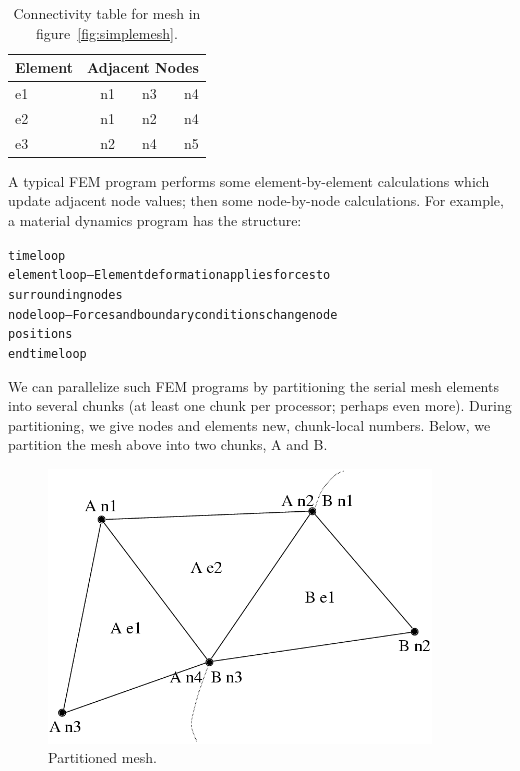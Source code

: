 \documentclass[10pt]{article}
\begin{document}
\begin{table}[h]
\begin{center}
\begin{tabular}{||l||r|r|r||}\hline
Element & \multicolumn{3}{c||}{Adjacent Nodes} \\\hline
e1 & n1 & n3 & n4 \\
e2 & n1 & n2 & n4 \\
e3 & n2 & n4 & n5 \\
\hline
\end{tabular}
\end{center}
\caption{Connectivity table for mesh in figure~\ref{fig:simplemesh}.}
\label{table:simplemesh}
\end{table}

A typical FEM program performs some element-by-element calculations which
update adjacent node values; then some node-by-node calculations.  For
example, a material dynamics program has the structure:

\begin{alltt}
     time loop
          element loop-- Element deformation applies forces to
          surrounding nodes
          node loop-- Forces and boundary conditions change node
          positions
     end time loop
\end{alltt}

We can parallelize such FEM programs by partitioning the serial mesh
elements into several chunks  (at least one chunk per processor; perhaps
even more).  During partitioning, we give nodes and elements new,
chunk-local numbers.  Below, we partition the mesh above into two chunks, A
and B.

\begin{figure}[h]
\begin{center}
\includegraphics[width=4in]{partitioned_mesh}
\end{center}
\caption{Partitioned mesh.}
\label{fig:partitionedmesh}
\end{figure}
\end{document}
